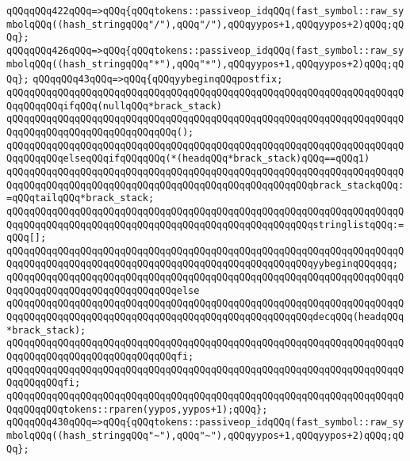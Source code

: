 \verb|qQQqqQQq422qQQq=>qQQq{qQQqtokens::passiveop_idqQQq(fast_symbol::raw_symbolqQQq((hash_stringqQQq"/"),qQQq"/"),qQQqyypos+1,qQQqyypos+2)qQQq;qQQq};|\newline
\verb|qQQqqQQq426qQQq=>qQQq{qQQqtokens::passiveop_idqQQq(fast_symbol::raw_symbolqQQq((hash_stringqQQq"*"),qQQq"*"),qQQqyypos+1,qQQqyypos+2)qQQq;qQQq};|\newline
\verb|qQQqqQQq43qQQq=>qQQq{qQQqyybeginqQQqpostfix;|\newline
\verb|qQQqqQQqqQQqqQQqqQQqqQQqqQQqqQQqqQQqqQQqqQQqqQQqqQQqqQQqqQQqqQQqqQQqqQQqqQQqqQQqifqQQq(nullqQQq*brack_stack)|\newline
\verb|qQQqqQQqqQQqqQQqqQQqqQQqqQQqqQQqqQQqqQQqqQQqqQQqqQQqqQQqqQQqqQQqqQQqqQQqqQQqqQQqqQQqqQQqqQQqqQQqqQQq();|\newline
\verb|qQQqqQQqqQQqqQQqqQQqqQQqqQQqqQQqqQQqqQQqqQQqqQQqqQQqqQQqqQQqqQQqqQQqqQQqqQQqqQQqelseqQQqifqQQqqQQq(*(headqQQq*brack_stack)qQQq==qQQq1)|\newline
\verb|qQQqqQQqqQQqqQQqqQQqqQQqqQQqqQQqqQQqqQQqqQQqqQQqqQQqqQQqqQQqqQQqqQQqqQQqqQQqqQQqqQQqqQQqqQQqqQQqqQQqqQQqqQQqqQQqqQQqqQQqqQQqbrack_stackqQQq:=qQQqtailqQQq*brack_stack;|\newline
\verb|qQQqqQQqqQQqqQQqqQQqqQQqqQQqqQQqqQQqqQQqqQQqqQQqqQQqqQQqqQQqqQQqqQQqqQQqqQQqqQQqqQQqqQQqqQQqqQQqqQQqqQQqqQQqqQQqqQQqqQQqqQQqstringlistqQQq:=qQQq[];|\newline
\verb|qQQqqQQqqQQqqQQqqQQqqQQqqQQqqQQqqQQqqQQqqQQqqQQqqQQqqQQqqQQqqQQqqQQqqQQqqQQqqQQqqQQqqQQqqQQqqQQqqQQqqQQqqQQqqQQqqQQqqQQqqQQqyybeginqQQqqqq;|\newline
\verb|qQQqqQQqqQQqqQQqqQQqqQQqqQQqqQQqqQQqqQQqqQQqqQQqqQQqqQQqqQQqqQQqqQQqqQQqqQQqqQQqqQQqqQQqqQQqqQQqqQQqelse|\newline
\verb|qQQqqQQqqQQqqQQqqQQqqQQqqQQqqQQqqQQqqQQqqQQqqQQqqQQqqQQqqQQqqQQqqQQqqQQqqQQqqQQqqQQqqQQqqQQqqQQqqQQqqQQqqQQqqQQqqQQqqQQqqQQqdecqQQq(headqQQq*brack_stack);|\newline
\verb|qQQqqQQqqQQqqQQqqQQqqQQqqQQqqQQqqQQqqQQqqQQqqQQqqQQqqQQqqQQqqQQqqQQqqQQqqQQqqQQqqQQqqQQqqQQqqQQqqQQqfi;|\newline
\verb|qQQqqQQqqQQqqQQqqQQqqQQqqQQqqQQqqQQqqQQqqQQqqQQqqQQqqQQqqQQqqQQqqQQqqQQqqQQqqQQqfi;|\newline
\verb|qQQqqQQqqQQqqQQqqQQqqQQqqQQqqQQqqQQqqQQqqQQqqQQqqQQqqQQqqQQqqQQqqQQqqQQqqQQqqQQqtokens::rparen(yypos,yypos+1);qQQq};|\newline
\verb|qQQqqQQq430qQQq=>qQQq{qQQqtokens::passiveop_idqQQq(fast_symbol::raw_symbolqQQq((hash_stringqQQq"~"),qQQq"~"),qQQqyypos+1,qQQqyypos+2)qQQq;qQQq};|\newline

